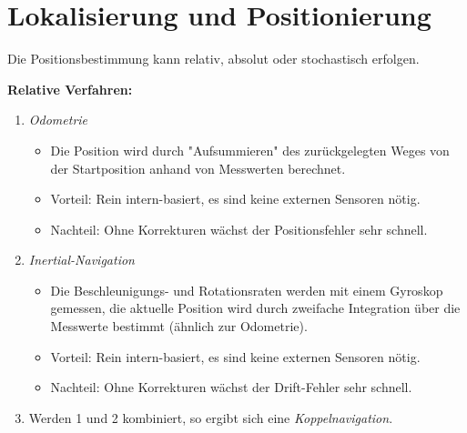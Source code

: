 	\section{Lokalisierung und Positionierung}
		Die Positionsbestimmung kann relativ, absolut oder stochastisch erfolgen.
		
		\textbf{Relative Verfahren:}
		\begin{enumerate}
			\item \emph{Odometrie}
				\begin{itemize}
					\item Die Position wird durch "Aufsummieren" des zurückgelegten Weges von der Startposition anhand von Messwerten berechnet.
					\item Vorteil: Rein intern-basiert, \dh es sind keine externen Sensoren nötig.
					\item Nachteil: Ohne Korrekturen wächst der Positionsfehler sehr schnell.
				\end{itemize}
			\item \emph{Inertial-Navigation}
				\begin{itemize}
					\item Die Beschleunigungs- und Rotationsraten werden mit einem Gyroskop gemessen, die aktuelle Position wird durch zweifache Integration über die Messwerte bestimmt (ähnlich zur Odometrie).
					\item Vorteil: Rein intern-basiert, \dh es sind keine externen Sensoren nötig.
					\item Nachteil: Ohne Korrekturen wächst der Drift-Fehler sehr schnell.
				\end{itemize}
			\item[] Werden 1 und 2 kombiniert, so ergibt sich eine \emph{Koppelnavigation}.
		\end{enumerate}
	
